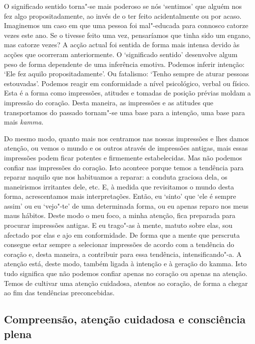 O significado sentido torna"-se mais poderoso se nós `sentimos' que alguém nos
fez algo propositadamente, ao invés de o ter feito acidentalmente ou por acaso.
Imaginemos um caso em que uma pessoa foi mal"-educada para connosco catorze vezes
este ano. Se o tivesse feito uma vez, pensaríamos que tinha sido um engano, mas
catorze vezes? A acção actual foi sentida de forma mais intensa devido às acções
que ocorreram anteriormente. O `significado sentido' desenvolve algum peso de
forma dependente de uma inferência emotiva. Podemos inferir intenção: `Ele fez
aquilo propositadamente'. Ou fatalismo: `Tenho sempre de aturar pessoas
estouvadas'. Podemos reagir em conformidade a nível psicológico, verbal ou
físico. Esta é a forma como impressões, atitudes e tomadas de posição prévias
moldam a impressão do coração. Desta maneira, as impressões e as atitudes que
transportamos do passado tornam"-se uma base para a intenção, uma base para mais
\emph{kamma}.

Do mesmo modo, quanto mais nos centramos nas nossas impressões e lhes damos
atenção, ou vemos o mundo e os outros através de impressões antigas, mais essas
impressões podem ficar potentes e firmemente estabelecidas. Mas não podemos
confiar nas impressões do coração. Isto acontece porque temos a tendência para
reparar naquilo que nos habituamos a reparar: a conduta graciosa dela, os
maneirismos irritantes dele, etc. E, à medida que revisitamos o mundo desta
forma, acrescentamos mais interpretações. Então, eu `sinto' que `ele é sempre
assim' ou eu `vejo"-te' de uma determinada forma, ou eu apenas reparo nos meus
maus hábitos. Deste modo o meu foco, a minha atenção, fica preparada para
procurar impressões antigas. E eu trago"-as à mente, matuto sobre elas, sou
afectado por elas e ajo em conformidade. De forma que a mente que perscruta
consegue estar sempre a selecionar impressões de acordo com a tendência do
coração e, desta maneira, a contribuir para essa tendência, intensificando"-a. A
atenção está, deste modo, também ligada à intenção e à geração do kamma. Isto
tudo significa que não podemos confiar apenas no coração ou apenas na atenção.
Temos de cultivar uma atenção cuidadosa, atentos ao coração, de forma a chegar
ao fim das tendências preconcebidas.

\subsection{Compreensão, atenção cuidadosa e consciência plena}


